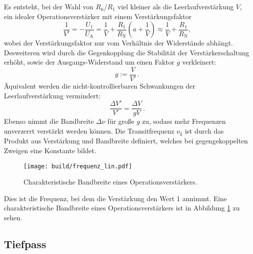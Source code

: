 Es entsteht, bei der Wahl von $R_\text{n}/ R_\text{1}$ viel kleiner als die
Leerlaufverstärkung $V$, ein idealer Operationsverstärker mit einem Verstärkungsfaktor
\begin{equation}
  \label{eq:v_strich}
		\frac{1}{V'}= - \frac{U_1}{U_\text{A}} = \frac{1}{V} +
		\frac{R_1}{R_\text{N}} \left( a + \frac{1}{V} \right) \approx
		\frac{1}{V} + \frac{R_1}{R_\text{N}},
\end{equation}
wobei der Verstärkungsfaktor nur vom Verhältnis der Widerstände abhängt.
Desweiteren wird durch die Gegenkopplung die Stabilität der
Verstärkerschaltung erhöht, sowie der Ausgangs-Widerstand um einen
Faktor $g$ verkleinert:
\begin{equation}
		g := \frac{V}{V'} \, .
\end{equation}
Äquivalent werden die nicht-kontrollierbaren Schwankungen der
Leerlaufverstärkung vermindert:
\begin{equation}
		\frac{\Delta V'}{V'} = \frac{\Delta V}{g V} \, .
\end{equation}
Ebenso nimmt die Bandbreite $\Delta \nu$ für große $g$ zu, sodass
mehr Frequenzen unverzerrt verstärkt werden können.
Die Transitfrequenz $\nu_\text{g}$ ist durch das Produkt aus Verstärkung und
Bandbreite definiert, welches bei gegengekoppelten Zweigen eine Konstante
bildet.
\begin{figure}[ht]
		\centering
		\texttt{[image: build/frequenz\_lin.pdf]}
		\caption{Charakteristische Bandbreite eines Operationsverstärkers.\cite{anleitung}}
		\label{fig:freq}
\end{figure}
Dies ist die Frequenz, bei dem die Verstärkung den Wert 1 annimmt.
Eine charakteristische Bandbreite eines Operationsverstärkers ist in Abbildung
\ref{fig:freq} zu sehen.

\subsection{Tiefpass}%
\label{sub:tiefpass}

